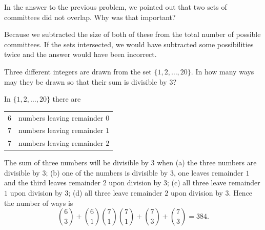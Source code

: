 \begin{ques}
In the answer to the previous problem, we pointed out that two sets of committees did not
overlap.  Why was that important?

\noindent
\answerlinetwo
\begin{answer}
Because we subtracted the size of both of these from the total number of possible
committees.  If the sets intersected, we would have subtracted some possibilities twice 
and the answer would have been incorrect.
\end{answer}
\end{ques}

\begin{exa}
Three different integers are drawn from the set $\{1,2,\ldots ,
20\}$. In how many ways may they be drawn so that their sum is
divisible by $3$?
\begin{sol} In $\{1,2,\ldots , 20\}$ there are
\begin{center}
\begin{tabular}{ll}
$6$ & numbers leaving remainder $0$ \\
$7$ & numbers leaving remainder $1$ \\
$7$ & numbers leaving remainder $2$ \\
\end{tabular}
\end{center}
 The sum
of three numbers will be divisible by $3$ when (a) the three numbers
are divisible by $3$; (b) one of the numbers is divisible by $3$,
one leaves remainder $1$ and the third leaves remainder $2$ upon
division by $3$; (c) all three leave remainder $1$ upon division by
$3$; (d) all three leave remainder $2$ upon division by $3$. Hence
the number of ways is
$$\binom{6}{3} + \binom{6}{1}\binom{7}{1}\binom{7}{1} + \binom{7}{3}+\binom{7}{3} = 384.$$
\end{sol}
\end{exa}




